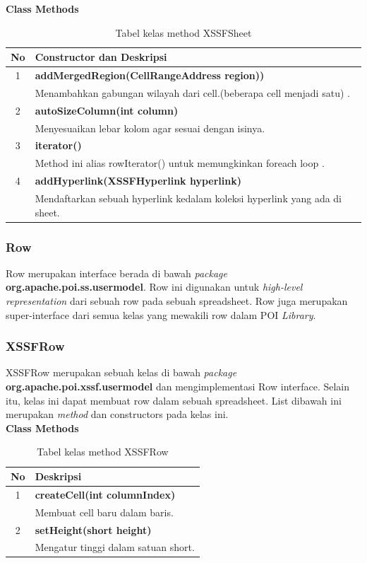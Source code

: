 \noindent \textbf{Class Methods}
\begin{table}[H]
		\centering
		\caption{Tabel kelas method XSSFSheet}
		\label{tab:methodXSSFSheet}
	\begin{tabular}{|c|p{12cm}|}
		\hline
		\textbf{No} & \textbf{Constructor dan Deskripsi} \\ \hline \hline
		1 & \textbf{addMergedRegion(CellRangeAddress region))}\\
			&	Menambahkan gabungan wilayah dari cell.(beberapa cell menjadi satu)   .\\ \hline 
		2 & \textbf{autoSizeColumn(int column)}\\
			& Menyesuaikan lebar kolom agar sesuai dengan isinya.\\ \hline
		3 & \textbf{iterator()}\\
			&	Method ini alias rowIterator() untuk memungkinkan foreach loop .\\ \hline
		4 & \textbf{addHyperlink(XSSFHyperlink hyperlink)}\\
			&	Mendaftarkan sebuah hyperlink kedalam koleksi hyperlink yang ada di sheet.\\ \hline	
	\end{tabular}
\end{table}

\subsubsection{Row}
\label{subs:Row}
Row merupakan interface berada di bawah \textit{package} \textbf{org.apache.poi.ss.usermodel}. Row ini digunakan untuk \textit{high-level representation} dari sebuah row pada sebuah spreadsheet. Row juga merupakan super-interface dari semua kelas yang mewakili row dalam POI \textit{Library}.\cite{apachepoi2}

\subsubsection{XSSFRow}
\label{subs:XSSFRow}
XSSFRow merupakan sebuah kelas di bawah \textit{package} \textbf{org.apache.poi.xssf.usermodel} dan mengimplementasi Row interface. Selain itu, kelas ini dapat membuat row dalam sebuah spreadsheet. List dibawah ini merupakan \textit{method} dan constructors pada kelas ini.\cite{apachepoi2}
 \\ 
\noindent \textbf{Class Methods}
\begin{table}[H]
		\centering
		\caption{Tabel kelas method XSSFRow}
		\label{tab:methodXSSFRow}
	\begin{tabular}{|c|p{12cm}|}
		\hline
		\textbf{No} & \textbf{Deskripsi} \\ \hline \hline
		1 & \textbf{createCell(int columnIndex)}\\
			&	Membuat cell baru dalam baris.\\ \hline 
		2 & \textbf{setHeight(short height)}\\
			&	Mengatur tinggi dalam satuan short.\\ \hline
	\end{tabular}
\end{table}

